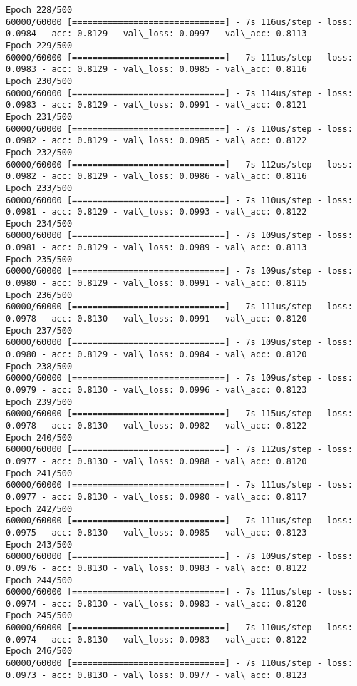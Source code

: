 \documentclass[11pt]{article}
\begin{document}
\begin{Verbatim}[commandchars=\\\{\}]
Epoch 228/500
60000/60000 [==============================] - 7s 116us/step - loss: 0.0984 - acc: 0.8129 - val\_loss: 0.0997 - val\_acc: 0.8113
Epoch 229/500
60000/60000 [==============================] - 7s 111us/step - loss: 0.0983 - acc: 0.8129 - val\_loss: 0.0985 - val\_acc: 0.8116
Epoch 230/500
60000/60000 [==============================] - 7s 114us/step - loss: 0.0983 - acc: 0.8129 - val\_loss: 0.0991 - val\_acc: 0.8121
Epoch 231/500
60000/60000 [==============================] - 7s 110us/step - loss: 0.0982 - acc: 0.8129 - val\_loss: 0.0985 - val\_acc: 0.8122
Epoch 232/500
60000/60000 [==============================] - 7s 112us/step - loss: 0.0982 - acc: 0.8129 - val\_loss: 0.0986 - val\_acc: 0.8116
Epoch 233/500
60000/60000 [==============================] - 7s 110us/step - loss: 0.0981 - acc: 0.8129 - val\_loss: 0.0993 - val\_acc: 0.8122
Epoch 234/500
60000/60000 [==============================] - 7s 109us/step - loss: 0.0981 - acc: 0.8129 - val\_loss: 0.0989 - val\_acc: 0.8113
Epoch 235/500
60000/60000 [==============================] - 7s 109us/step - loss: 0.0980 - acc: 0.8129 - val\_loss: 0.0991 - val\_acc: 0.8115
Epoch 236/500
60000/60000 [==============================] - 7s 111us/step - loss: 0.0978 - acc: 0.8130 - val\_loss: 0.0991 - val\_acc: 0.8120
Epoch 237/500
60000/60000 [==============================] - 7s 109us/step - loss: 0.0980 - acc: 0.8129 - val\_loss: 0.0984 - val\_acc: 0.8120
Epoch 238/500
60000/60000 [==============================] - 7s 109us/step - loss: 0.0979 - acc: 0.8130 - val\_loss: 0.0996 - val\_acc: 0.8123
Epoch 239/500
60000/60000 [==============================] - 7s 115us/step - loss: 0.0978 - acc: 0.8130 - val\_loss: 0.0982 - val\_acc: 0.8122
Epoch 240/500
60000/60000 [==============================] - 7s 112us/step - loss: 0.0977 - acc: 0.8130 - val\_loss: 0.0988 - val\_acc: 0.8120
Epoch 241/500
60000/60000 [==============================] - 7s 111us/step - loss: 0.0977 - acc: 0.8130 - val\_loss: 0.0980 - val\_acc: 0.8117
Epoch 242/500
60000/60000 [==============================] - 7s 111us/step - loss: 0.0975 - acc: 0.8130 - val\_loss: 0.0985 - val\_acc: 0.8123
Epoch 243/500
60000/60000 [==============================] - 7s 109us/step - loss: 0.0976 - acc: 0.8130 - val\_loss: 0.0983 - val\_acc: 0.8122
Epoch 244/500
60000/60000 [==============================] - 7s 111us/step - loss: 0.0974 - acc: 0.8130 - val\_loss: 0.0983 - val\_acc: 0.8120
Epoch 245/500
60000/60000 [==============================] - 7s 110us/step - loss: 0.0974 - acc: 0.8130 - val\_loss: 0.0983 - val\_acc: 0.8122
Epoch 246/500
60000/60000 [==============================] - 7s 110us/step - loss: 0.0973 - acc: 0.8130 - val\_loss: 0.0977 - val\_acc: 0.8123

\end{Verbatim}
\end{document}
